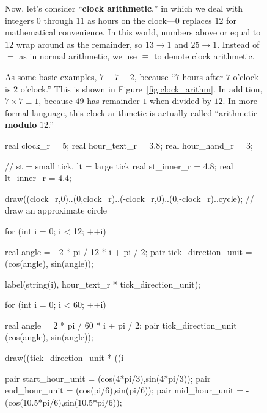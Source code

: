 \documentclass[../gatm.tex]{subfiles}
\begin{document}
\begin{figure}[h]
	\begin{center}
		\begin{minipage}[c]{0.55\textwidth}
			\setlength{\parindent}{15pt}
			\setlength{\parskip}{0.25em}
			\noindent Now, let's consider ``\textbf{clock arithmetic},'' in which we deal with integers $0$ through $11$ as hours on the clock---$0$ replaces $12$ for mathematical convenience. In this world, numbers above or equal to $12$ wrap around as the remainder, so $13\to 1$ and $25\to 1$. Instead of $=$ as in normal arithmetic, we use $\equiv$ to denote clock arithmetic.%
				
			As some basic examples, $7+7\equiv 2$, because ``$7$ hours after $7$ o'clock is $2$ o'clock.'' This is shown in Figure~\ref{fig:clock_arithm}. In addition, $7\times 7\equiv 1$, because $49$ has remainder $1$ when divided by $12$. In more formal language, this clock arithmetic is actually called ``arithmetic \textbf{modulo} $12$.''
		\end{minipage}
		\hfill
		\begin{minipage}[c]{0.35\textwidth}
			\begin{center}
				\begin{minipage}[b]{\textwidth}
					\centering
					\begin{asy}[width=0.7\textwidth]
						real clock_r = 5;
						real hour_text_r = 3.8;
						real hour_hand_r = 3;
						
						// st = small tick, lt = large tick
						real st_inner_r = 4.8;
						real lt_inner_r = 4.4;
						
						draw((clock_r,0)..(0,clock_r)..(-clock_r,0)..(0,-clock_r)..cycle); // draw an approximate circle
						
						for (int i = 0; i < 12; ++i) {
						real angle = - 2 * pi / 12 * i + pi / 2;
						pair tick_direction_unit = (cos(angle), sin(angle));
						
						label(string(i), hour_text_r * tick_direction_unit);
						}
						
						
						for (int i = 0; i < 60; ++i) {
						real angle = 2 * pi / 60 * i + pi / 2;
						pair tick_direction_unit = (cos(angle), sin(angle));
						
						draw((tick_direction_unit * ((i %
						}
						
						pair start_hour_unit = (cos(4*pi/3),sin(4*pi/3));
						pair end_hour_unit = (cos(pi/6),sin(pi/6));
						pair mid_hour_unit = -(cos(10.5*pi/6),sin(10.5*pi/6));
						

\end{asy}
\end{minipage}
\end{center}
\end{minipage}
\end{center}
\end{figure}
\end{document}
